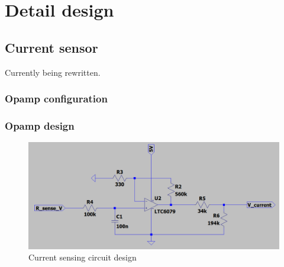 \chapter{Detail design}\label{ch:detail_design}
\section{Current sensor}\label{sec:current_sensor_design}
Currently being rewritten.
\subsection{Opamp configuration}\label{sec:config}


\subsection{Opamp design}
\begin{figure}
\centering
\includegraphics[width=0.65\linewidth]{./Figures/CurSens_SimCir.png}
\caption{Current sensing circuit design}
\label{fig:cursen_sim_cir}
\end{figure}


